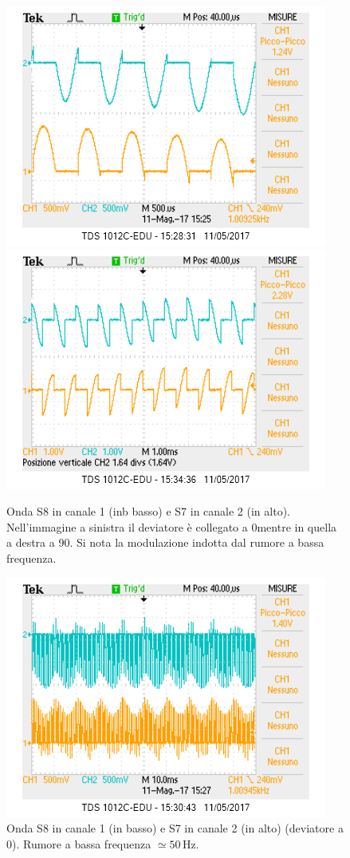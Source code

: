 \documentclass[10pt,a4paper]{article}
\begin{document}
\begin{figure}[!htb]
  \centering
  \includegraphics[scale=0.75]{dev0ch1S8-ch2S7.png}\includegraphics[scale=0.75]{dev90ch1S8-ch2S7.png}
\caption{Onda S8 in canale 1 (inb basso) e S7 in canale 2 (in alto). Nell'immagine a sinistra il deviatore è collegato a 0\degree mentre in quella a destra a 90\degree . Si nota la modulazione indotta dal rumore a bassa frequenza.\label{osc:S7S8}}
\end{figure}

\begin{figure}[!htb]
  \centering
  \includegraphics[scale=0.75]{perFedech1S8-ch2S7.png}
\caption{Onda S8 in canale 1 (in basso) e S7 in canale 2 (in alto) (deviatore a 0\degree). Rumore a bassa frequenza $\simeq 50\,\mbox{Hz}$.\label{osc:rumore50hz}}
\end{figure}
\end{document}
